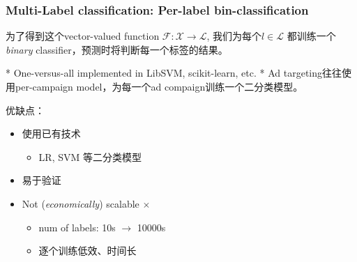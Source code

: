\documentclass{beamer}
\begin{document}
\begin{frame}
\frametitle{Multi-Label classification: Per-label bin-classification}

为了得到这个vector-valued function $\mathcal{F} : \mathcal{X} \rightarrow \mathcal{L}$, 我们为每个$\mathit{l} \in \mathcal{L}$ 都训练一个\textit{binary} classifier，预测时将判断每一个标签的结果。

* {\small \color{gray} One-versus-all implemented in LibSVM, scikit-learn, etc.}
* {\small \color{gray} Ad targeting往往使用per-campaign model，为每一个ad compaign训练一个二分类模型。}
\pause

优缺点：
\begin{itemize}
\item 使用已有技术 {  \color{green} \checkmark}
  \begin{itemize}
  \item LR, SVM 等二分类模型
  \end{itemize}
\item 易于验证 {  \color{green} \checkmark}
\item Not (\textit{economically}) scalable  {  \color{red} $\times$}
  \begin{itemize}
  \item num of labels: 10s $\rightarrow$ 10000s 
  \item 逐个训练低效、时间长
  \end{itemize}
\end{itemize}
\end{frame}
\end{document}
